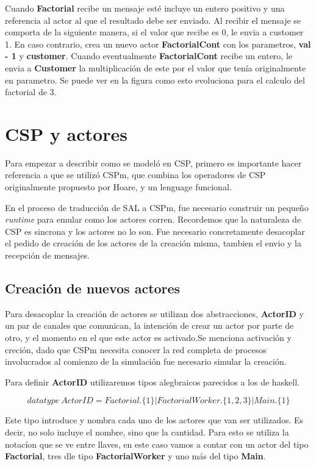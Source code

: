 \documentclass[fleqn]{article}
\begin{document}
Cuando \textbf{Factorial} recibe un mensaje esté incluye un entero positivo y
una referencia al actor al que el resultado debe ser enviado. Al recibir el
mensaje se comporta de la siguiente manera, si el valor que recibe es 0, le
envia a customer 1. En caso contrario, crea un nuevo actor
\textbf{FactorialCont} con los parametros, \textbf{val - 1} y \textbf{customer}.
Cuando eventualmente \textbf{FactorialCont} recibe un entero, le envia a
\textbf{Customer} la multiplicación de este por el valor que tenía originalmente
en parametro. Se puede ver en la figura como esto evoluciona para el calculo del
factorial de 3.

\section{CSP y actores}
Para empezar a describir como se modeló en CSP, primero es importante hacer
referencia a que se utilizó CSPm, que combina los operadores de CSP
originalmente propuesto por Hoare, y un lenguage funcional.

En el proceso de traducción de SAL a CSPm, fue necesario construir un pequeño
\textit{runtime} para emular como los actores corren. Recordemos que la
naturaleza de CSP es sincrona y los actores no lo son. Fue necesario
concretamente desacoplar el pedido de creación de los actores de la creación
misma, tambien el envio y la recepción de mensajes. 

\subsection{Creación de nuevos actores}

Para desacoplar la creación de actores se utilizan dos abstracciones,
\textbf{ActorID} y un par de canales que comunican, la intención de crear un
actor por parte de otro, y el momento en el que este actor es activado.Se
menciona activación y creción, dado que CSPm necesita conocer la red completa
de procesos involucrados al comienzo de la simulación fue necesario simular la creación.

Para definir \textbf{ActorID} utilizaremos tipos alegbraicos parecidos a los de haskell.

\[
datatype\ ActorID = Factorial.\{1\} | FactorialWorker.\{1,2,3\} | Main.\{1\}
\]

Este tipo introduce y nombra cada uno de los actores que van ser utilizados. Es
decir, no solo incluye el nombre, sino que la cantidad. Para esto se utiliza la
notacíon que se ve entre llaves, en este caso vamos a contar con un actor del
tipo \textbf{Factorial}, tres dle tipo \textbf{FactorialWorker} y uno más del
tipo \textbf{Main}.
\end{document}
